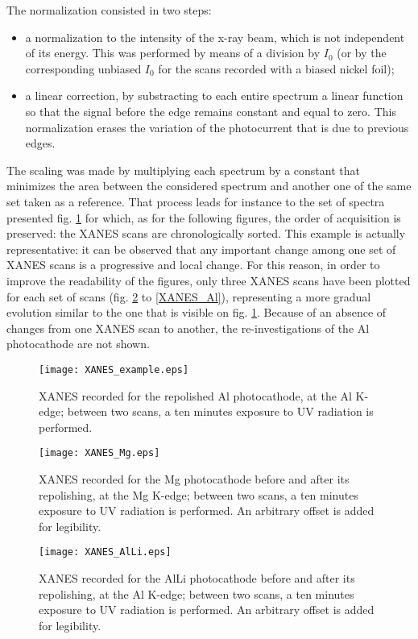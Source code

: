 \documentclass[aip,graphicx]{revtex4-1}
\begin{document}
The normalization consisted in two steps: 
\begin{itemize}
\itemsep0em 
\item a normalization to the intensity of the x-ray beam, which is not independent of its energy. This was performed by means of a division by $I_0$ (or by the corresponding unbiased $I_0$ for the scans recorded with a biased nickel foil);
\item a linear correction, by substracting to each entire spectrum a linear function so that the signal before the edge remains constant and equal to zero. This normalization erases the variation of the photocurrent that is due to previous edges.
\end{itemize}
The scaling was made by multiplying each spectrum by a constant that minimizes the area between the considered spectrum and another one of the same set taken as a reference. 
That process leads for instance to the set of spectra presented fig. \ref{XANES_example} for which, as for the following figures, the order of acquisition is preserved: the XANES scans are chronologically sorted.
This example is actually representative: it can be observed that any important change among one set of XANES scans is a progressive and local change. For this reason, in order to improve the readability of the figures, only three XANES scans have been plotted for each set of scans (fig. \ref{XANES_Mg} to \ref{XANES_Al}), representing a more gradual evolution similar to the one that is visible on fig. \ref{XANES_example}. Because of an absence of changes from one XANES scan to another, the re-investigations of the Al photocathode are not shown.

\begin{figure}
\texttt{[image: XANES\_example.eps]}%
\caption{XANES recorded for the repolished Al photocathode, at the Al K-edge; between two scans, a ten minutes exposure to UV radiation is performed.\label{XANES_example}}%
\end{figure}

\begin{figure}
\texttt{[image: XANES\_Mg.eps]}%
\caption{XANES recorded for the Mg photocathode before and after its repolishing, at the Mg K-edge; between two scans, a ten minutes exposure to UV radiation is performed. An arbitrary offset is added for legibility.\label{XANES_Mg}}%
\end{figure}

\begin{figure}
\texttt{[image: XANES\_AlLi.eps]}%
\caption{XANES recorded for the AlLi photocathode before and after its repolishing, at the Al K-edge; between two scans, a ten minutes exposure to UV radiation is performed. An arbitrary offset is added for legibility.\label{XANES_AlLi}}%
\end{figure}
\end{document}
